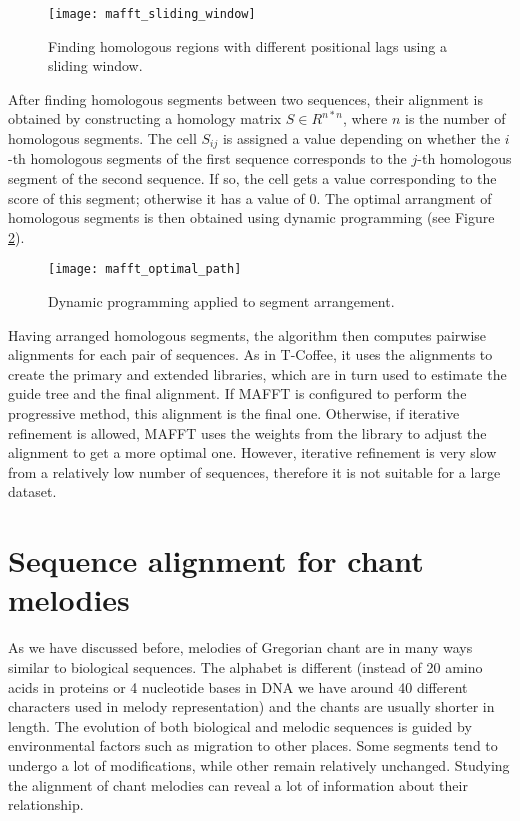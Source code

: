 \begin{figure}[h]
\centering
\texttt{[image: mafft\_sliding\_window]}
\caption{Finding homologous regions with different positional lags using a sliding window. \citep[Figure~1B]{mafft}}
\label{fig:mafft2}
\end{figure}

After finding homologous segments between two sequences, their alignment is obtained by constructing a homology matrix $S \in R^{n*n}$, where $n$ is the number of homologous
segments. The cell $S_{ij}$ is assigned a value depending on whether the $i$-th homologous segments of the first sequence corresponds to the $j$-th homologous segment
of the second sequence. If so, the cell gets a value corresponding to the score of this segment; otherwise it has a value of 0. The optimal arrangment of homologous segments
is then obtained using dynamic programming (see Figure \ref{fig:mafft3}).

\begin{figure}[h]
\centering
\texttt{[image: mafft\_optimal\_path]}
\caption{Dynamic programming applied to segment arrangement. \citep[Figure~2A]{mafft}}
\label{fig:mafft3}
\end{figure}

Having arranged homologous segments, the algorithm then computes pairwise alignments for each pair of sequences. As in T-Coffee, it uses the alignments to create
the primary and extended libraries, which are in turn used to estimate the guide tree and the final alignment. If MAFFT is configured to perform the progressive 
method, this alignment is the final one. Otherwise, if iterative refinement is allowed, MAFFT uses the weights from the library to adjust the alignment to get a more
optimal one. However, iterative refinement is very slow from a relatively low number of sequences, therefore it is not suitable for a large dataset.

\section{Sequence alignment for chant melodies}
\label{section:chant_alignment}

As we have discussed before, melodies of Gregorian chant are in many ways similar to biological sequences. The alphabet is different (instead of 20 amino acids
in proteins or 4 nucleotide bases in DNA we have around 40 different characters used in melody representation) and the chants are usually shorter in length.
The evolution of both biological and melodic sequences is guided by environmental factors such as migration to other places. Some segments tend to undergo a lot
of modifications, while other remain relatively unchanged. Studying the alignment of chant melodies can reveal a lot of information about their relationship.

